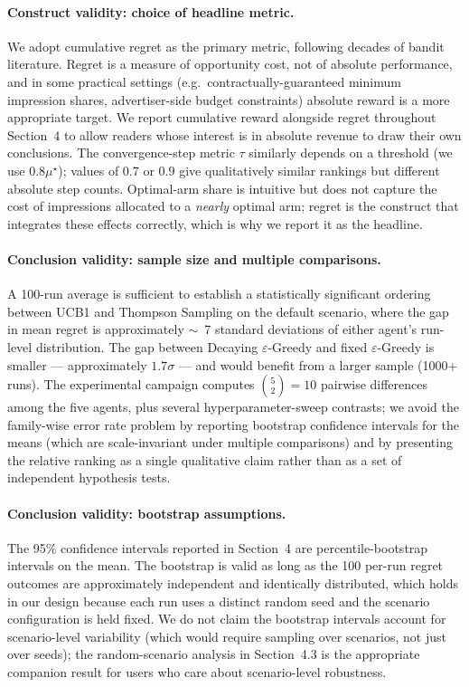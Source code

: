 \paragraph{Construct validity: choice of headline metric.}
We adopt cumulative regret as the primary metric, following decades of bandit literature. Regret is a measure of opportunity cost, not of absolute performance, and in some practical settings (e.g.\ contractually-guaranteed minimum impression shares, advertiser-side budget constraints) absolute reward is a more appropriate target. We report cumulative reward alongside regret throughout Section~4 to allow readers whose interest is in absolute revenue to draw their own conclusions. The convergence-step metric $\tau$ similarly depends on a threshold (we use $0.8\mu^\star$); values of $0.7$ or $0.9$ give qualitatively similar rankings but different absolute step counts. Optimal-arm share is intuitive but does not capture the cost of impressions allocated to a \emph{nearly} optimal arm; regret is the construct that integrates these effects correctly, which is why we report it as the headline.

\paragraph{Conclusion validity: sample size and multiple comparisons.}
A 100-run average is sufficient to establish a statistically significant ordering between UCB1 and Thompson Sampling on the default scenario, where the gap in mean regret is approximately $\sim$~7 standard deviations of either agent's run-level distribution. The gap between Decaying $\varepsilon$-Greedy and fixed $\varepsilon$-Greedy is smaller --- approximately $1.7\sigma$ --- and would benefit from a larger sample (1000+ runs). The experimental campaign computes $\binom{5}{2} = 10$ pairwise differences among the five agents, plus several hyperparameter-sweep contrasts; we avoid the family-wise error rate problem by reporting bootstrap confidence intervals for the means (which are scale-invariant under multiple comparisons) and by presenting the relative ranking as a single qualitative claim rather than as a set of independent hypothesis tests.

\paragraph{Conclusion validity: bootstrap assumptions.}
The 95\% confidence intervals reported in Section~4 are percentile-bootstrap intervals on the mean. The bootstrap is valid as long as the 100 per-run regret outcomes are approximately independent and identically distributed, which holds in our design because each run uses a distinct random seed and the scenario configuration is held fixed. We do not claim the bootstrap intervals account for scenario-level variability (which would require sampling over scenarios, not just over seeds); the random-scenario analysis in Section~4.3 is the appropriate companion result for users who care about scenario-level robustness.

